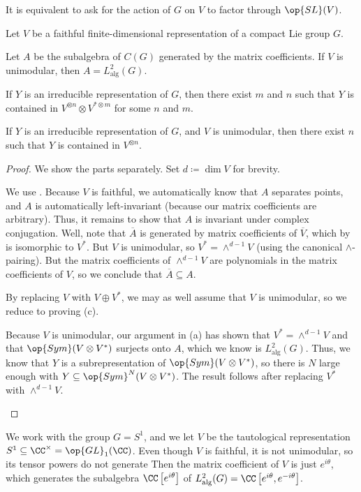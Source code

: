 \documentclass[../notes.tex]{subfiles}
\begin{document}
\begin{remark}
	It is equivalent to ask for the action of $G$ on $V$ to factor through $\op{SL}(V)$.
\end{remark}
\begin{proposition}
	Let $V$ be a faithful finite-dimensional representation of a compact Lie group $G$.
	\begin{listalph}
		\item Let $A$ be the subalgebra of $C(G)$ generated by the matrix coefficients. If $V$ is unimodular, then $A=L^2_{\mathrm{alg}}(G)$.
		\item If $Y$ is an irreducible representation of $G$, then there exist $m$ and $n$ such that $Y$ is contained in $V^{\otimes n}\otimes V^{*\otimes m}$ for some $n$ and $m$.
		\item If $Y$ is an irreducible representation of $G$, and $V$ is unimodular, then there exist $n$ such that $Y$ is contained in $V^{\otimes n}$.
	\end{listalph}
\end{proposition}
\begin{proof}
	We show the parts separately. Set $d\coloneqq\dim V$ for brevity.
	\begin{listalph}
		\item We use . Because $V$ is faithful, we automatically know that $A$ separates points, and $A$ is automatically left-invariant (because our matrix coefficients are arbitrary). Thus, it remains to show that $A$ is invariant under complex conjugation. Well, note that $\overline A$ is generated by matrix coefficients of $\overline V$, which by  is isomorphic to $V^*$. But $V$ is unimodular, so $V^*=\land^{d-1}V$ (using the canonical $\land$-pairing). But the matrix coefficients of $\land^{d-1}V$ are polynomials in the matrix coefficients of $V$, so we conclude that $\overline A\subseteq A$.
		\item By replacing $V$ with $V\oplus V^*$, we may as well assume that $V$ is unimodular, so we reduce to proving (c).
		\item Because $V$ is unimodular, our argument in (a) has shown that $V^*=\land^{d-1}V$ and that $\op{Sym}(V\otimes V^*)$ surjects onto $A$, which we know is $L^2_{\mathrm{alg}}(G)$. Thus, we know that $Y$ is a subrepresentation of $\op{Sym}(V\otimes V^*)$, so there is $N$ large enough with $Y\subseteq\op{Sym}^N(V\otimes V^*)$. The result follows after replacing $V^*$ with $\land^{d-1}V$.
		\qedhere
	\end{listalph}
\end{proof}
\begin{example}
	We work with the group $G=S^1$, and we let $V$ be the tautological representation $S^1\subseteq\CC^\times=\op{GL}_1(\CC)$. Even though $V$ is faithful, it is not unimodular, so its tensor powers do not generate Then the matrix coefficient of $V$ is just $e^{i\theta}$, which generates the subalgebra $\CC\left[e^{i\theta}\right]$ of $L^2_{\mathrm{alg}}(G)=\CC\left[e^{i\theta},e^{-i\theta}\right]$.
\end{example}
\end{document}
